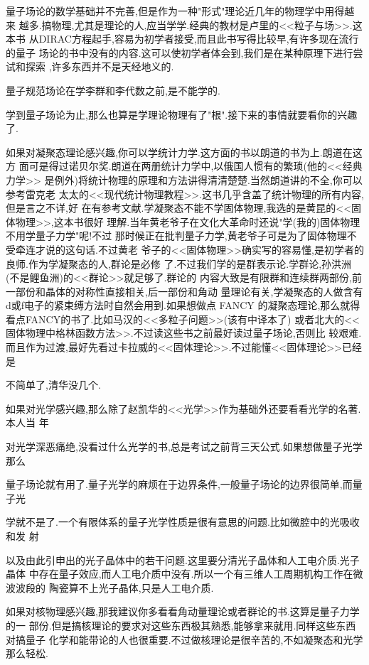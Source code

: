 量子场论的数学基础并不完善,但是作为一种"形式"理论近几年的物理学中用得越来
越多.搞物理,尤其是理论的人,应当学学.经典的教材是卢里的<<粒子与场>>.这本书
从DIRAC方程起手,容易为初学者接受,而且此书写得比较早,有许多现在流行的量子
场论的书中没有的内容.这可以使初学者体会到,我们是在某种原理下进行尝试和探索
,许多东西并不是天经地义的.

量子规范场论在学李群和李代数之前,是不能学的.

学到量子场论为止,那么也算是学理论物理有了"根".接下来的事情就要看你的兴趣了.

如果对凝聚态理论感兴趣,你可以学统计力学.这方面的书以朗道的书为上.朗道在这方
面可是得过诺贝尔奖.朗道在两册统计力学中,以俄国人惯有的繁琐(他的<<经典力学>>
是例外)将统计物理的原理和方法讲得清清楚楚.当然朗道讲的不全,你可以参考雷克老
太太的<<现代统计物理教程>>.这书几乎含盖了统计物理的所有内容,但是言之不详,好
在有参考文献.学凝聚态不能不学固体物理,我选的是黄昆的<<固体物理>>,这本书很好
理解.当年黄老爷子在文化大革命时还说"学(我的)固体物理不用学量子力学"呢!不过
那时候正在批判量子力学,黄老爷子可是为了固体物理不受牵连才说的这句话.不过黄老
爷子的<<固体物理>>确实写的容易懂,是初学者的良师.作为学凝聚态的人,群论是必修
了.不过我们学的是群表示论.学群论,孙洪洲(不是鲤鱼洲)的<<群论>>就足够了.群论的
内容大致是有限群和连续群两部份,前一部份和晶体的对称性直接相关,后一部份和角动
量理论有关,学凝聚态的人做含有d或f电子的紧束缚方法时自然会用到.如果想做点
FANCY
的凝聚态理论,那么就得看点FANCY的书了.比如马汉的<<多粒子问题>>(该有中译本了)
或者北大的<<固体物理中格林函数方法>>.不过读这些书之前最好读过量子场论,否则比
较艰难.而且作为过渡,最好先看过卡拉威的<<固体理论>>.不过能懂<<固体理论>>已经是

不简单了,清华没几个.

如果对光学感兴趣,那么除了赵凯华的<<光学>>作为基础外还要看看光学的名著.本人当
年

对光学深恶痛绝,没看过什么光学的书,总是考试之前背三天公式.如果想做量子光学那么

量子场论就有用了.量子光学的麻烦在于边界条件,一般量子场论的边界很简单,而量子光

学就不是了.一个有限体系的量子光学性质是很有意思的问题.比如微腔中的光吸收和发
射

以及由此引申出的光子晶体中的若干问题.这里要分清光子晶体和人工电介质.光子晶体
中存在量子效应,而人工电介质中没有.所以一个有三维人工周期机构工作在微波波段的
陶瓷算不上光子晶体,只是人工电介质.

如果对核物理感兴趣,那我建议你多看看角动量理论或者群论的书.这算是量子力学的一
部份.但是搞核理论的要求对这些东西极其熟悉,能够拿来就用.同样这些东西对搞量子
化学和能带论的人也很重要.不过做核理论是很辛苦的,不如凝聚态和光学那么轻松.

